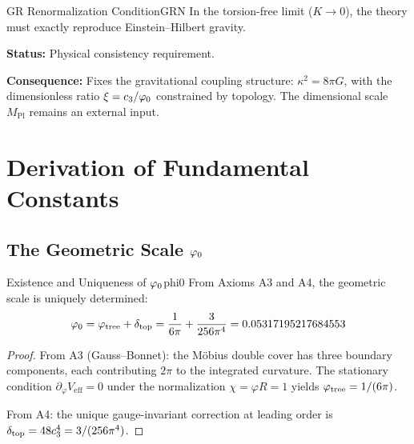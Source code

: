 \begin{axiom}{GR Renormalization Condition}{GRN}
In the torsion-free limit ($K \to 0$), the theory must exactly reproduce 
Einstein--Hilbert gravity.

\tcblower
\textbf{Status:} Physical consistency requirement.

\textbf{Consequence:} Fixes the gravitational coupling structure:
$\kappa^2 = 8\pi G$, with the dimensionless ratio $\xi = c_3/\varphi_0$ constrained by topology.
The dimensional scale $M_{\mathrm{Pl}}$ remains an external input.
\end{axiom}

\section{Derivation of Fundamental Constants}

\subsection{The Geometric Scale $\varphi_0$}

\begin{theorem}{Existence and Uniqueness of $\varphi_0$}{phi0}
From Axioms A3 and A4, the geometric scale is uniquely determined:
\begin{equation}
    \varphi_0 = \varphi_{\mathrm{tree}} + \delta_{\mathrm{top}} = \frac{1}{6\pi} + \frac{3}{256\pi^4} = 0.05317195217684553
\end{equation}
\end{theorem}

\begin{proof}
From A3 (Gauss--Bonnet): the M\"obius double cover has three boundary components, 
each contributing $2\pi$ to the integrated curvature. The stationary condition 
$\partial_\varphi V_{\text{eff}} = 0$ under the normalization $\chi = \varphi R = 1$ 
yields $\varphi_{\mathrm{tree}} = 1/(6\pi)$.

From A4: the unique gauge-invariant correction at leading order is 
$\delta_{\mathrm{top}} = 48c_3^4 = 3/(256\pi^4)$.
\end{proof}

